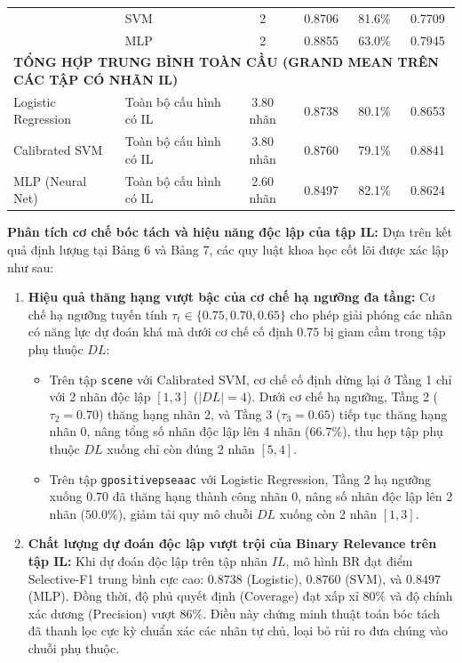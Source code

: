 \documentclass[10pt,a4paper,twoside]{article}
\begin{document}
\begin{table}[H]
{\begin{tabular}{llcccc}
         & SVM & 2 & 0.8706 & 81.6\% & 0.7709 \\
         & MLP & 2 & 0.8855 & 63.0\% & 0.7945 \\
\midrule
\multicolumn{6}{l}{\textbf{TỔNG HỢP TRUNG BÌNH TOÀN CẦU (GRAND MEAN TRÊN CÁC TẬP CÓ NHÃN IL)}} \\
Logistic Regression & Toàn bộ cấu hình có IL & 3.80 nhãn & 0.8738 & 80.1\% & 0.8653 \\
Calibrated SVM      & Toàn bộ cấu hình có IL & 3.80 nhãn & 0.8760 & 79.1\% & 0.8841 \\
MLP (Neural Net)    & Toàn bộ cấu hình có IL & 2.60 nhãn & 0.8497 & 82.1\% & 0.8624 \\
\bottomrule
\end{tabular}%
}
\end{table}

\noindent\textbf{Phân tích cơ chế bóc tách và hiệu năng độc lập của tập IL:}
Dựa trên kết quả định lượng tại Bảng 6 và Bảng 7, các quy luật khoa học cốt lõi được xác lập như sau:
\begin{enumerate}[leftmargin=*]
    \item \textbf{Hiệu quả thăng hạng vượt bậc của cơ chế hạ ngưỡng đa tầng:}
    Cơ chế hạ ngưỡng tuyến tính $\tau_t \in \{0.75, 0.70, 0.65\}$ cho phép giải phóng các nhãn có năng lực dự đoán khá mà dưới cơ chế cố định $0.75$ bị giam cầm trong tập phụ thuộc $DL$:
    \begin{itemize}
        \item Trên tập \texttt{scene} với Calibrated SVM, cơ chế cố định dừng lại ở Tầng 1 chỉ với 2 nhãn độc lập $[1, 3]$ ($|DL|=4$). Dưới cơ chế hạ ngưỡng, Tầng 2 ($\tau_2=0.70$) thăng hạng nhãn 2, và Tầng 3 ($\tau_3=0.65$) tiếp tục thăng hạng nhãn 0, nâng tổng số nhãn độc lập lên 4 nhãn ($66.7\%$), thu hẹp tập phụ thuộc $DL$ xuống chỉ còn đúng 2 nhãn $[5, 4]$.
        \item Trên tập \texttt{gpositivepseaac} với Logistic Regression, Tầng 2 hạ ngưỡng xuống $0.70$ đã thăng hạng thành công nhãn 0, nâng số nhãn độc lập lên 2 nhãn ($50.0\%$), giảm tải quy mô chuỗi $DL$ xuống còn 2 nhãn $[1, 3]$.
    \end{itemize}
    \item \textbf{Chất lượng dự đoán độc lập vượt trội của Binary Relevance trên tập IL:} Khi dự đoán độc lập trên tập nhãn $IL$, mô hình BR đạt điểm Selective-F1 trung bình cực cao: $0.8738$ (Logistic), $0.8760$ (SVM), và $0.8497$ (MLP). Đồng thời, độ phủ quyết định (Coverage) đạt xấp xỉ $80\%$ và độ chính xác dương (Precision) vượt $86\%$. Điều này chứng minh thuật toán bóc tách đã thanh lọc cực kỳ chuẩn xác các nhãn tự chủ, loại bỏ rủi ro đưa chúng vào chuỗi phụ thuộc.
\end{enumerate}
\end{document}
